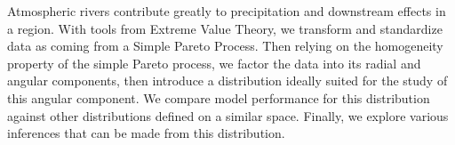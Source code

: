 

Atmospheric rivers contribute greatly to precipitation and downstream effects in a region.
  With tools from Extreme Value Theory, we transform and standardize data as coming from a
  Simple Pareto Process.  Then relying on the homogeneity property of the simple Pareto process,
  we factor the data into its radial and angular components, then introduce a distribution ideally
  suited for the study of this angular component.  We compare model performance for this distribution
  against other distributions defined on a similar space.  Finally, we explore various inferences
  that can be made from this distribution.

